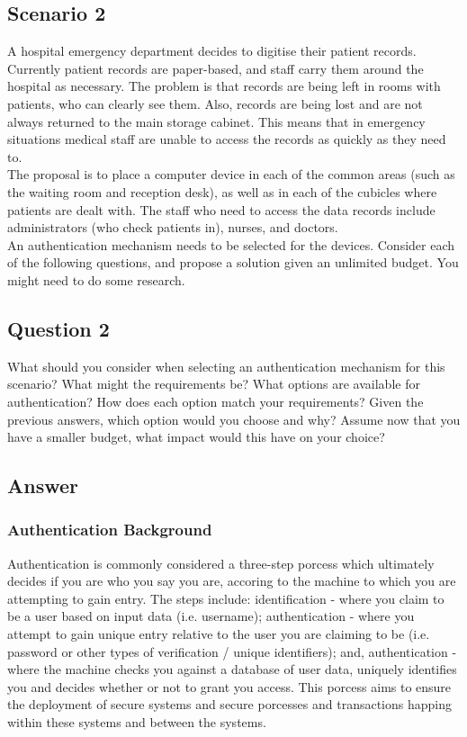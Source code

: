 \documentclass[11pt, english]{article}
\begin{document}
\newpage

	\subsection{Scenario 2}

	A hospital emergency department decides to digitise their patient records. Currently patient records are paper-based, and staff carry them around the hospital as necessary. The problem is that records are being left in rooms with patients, who can clearly see them. Also, records are being lost and are not always returned to the main storage cabinet. This means that in emergency situations medical staff are unable to access the records as quickly as they need to.\\

	The proposal is to place a computer device in each of the common areas (such as the waiting room and reception desk), as well as in each of the cubicles where patients are dealt with. The staff who need to access the data records include administrators (who check patients in), nurses, and doctors.\\

	An authentication mechanism needs to be selected for the devices. Consider each of the following questions, and propose a solution given an unlimited budget. You might need to do some research.

	\subsection{Question 2}

	What should you consider when selecting an authentication mechanism for this scenario? What might the requirements be? What options are available for authentication? How does each option match your requirements? Given the previous answers, which option would you choose and why? Assume now that you have a smaller budget, what impact would this have on your choice?

	\subsection{Answer}

		\subsubsection{Authentication Background}

	Authentication is commonly considered a three-step porcess which ultimately decides if you are who you say you are, accoring to the machine to which you are attempting to gain entry. The steps include: identification - where you claim to be a user based on input data (i.e. username); authentication - where you attempt to gain unique entry relative to the user you are claiming to be (i.e. password or other types of verification / unique identifiers); and, authentication - where the machine checks you against a database of user data, uniquely identifies you and decides whether or not to grant you access. This porcess aims to ensure the deployment of secure systems and secure porcesses and transactions happing within these systems and between the systems.
\end{document}
